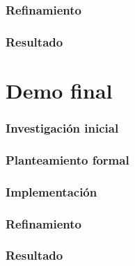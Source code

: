 \subsection{Refinamiento}
\subsection{Resultado}

\chapter{Demo final}

\subsection{Investigación inicial}
\subsection{Planteamiento formal}
\subsection{Implementación}
\subsection{Refinamiento}
\subsection{Resultado}
